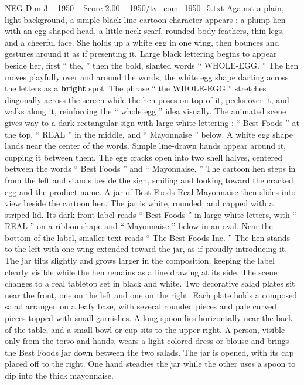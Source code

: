 \begin{textsample}{NEG Dim 3 – 1950 – Score 2.00 – 1950/tv\_com\_1950\_5.txt}  \label{ex:f3_neg_087}
Against a plain, light background, a simple black-line cartoon character appears : a plump hen with an egg-shaped head, a little neck scarf, rounded body feathers, thin legs, and a cheerful face.
She holds up a white egg in one wing, then bounces and gestures around it as if presenting it.
Large black lettering begins to appear beside her, first “ the, ” then the bold, slanted words “ WHOLE-EGG. ” The hen moves playfully over and around the words, the white egg shape darting across the letters as a \textbf{bright} spot.
The phrase “ the WHOLE-EGG ” stretches diagonally across the screen while the hen poses on top of it, peeks over it, and walks along it, reinforcing the “ whole egg ” idea visually.
The animated scene gives way to a dark rectangular sign with large white lettering : “ Best Foods ” at the top, “ REAL ” in the middle, and “ Mayonnaise ” below.
A white egg shape lands near the center of the words.
Simple line-drawn hands appear around it, cupping it between them.
The egg cracks open into two shell halves, centered between the words “ Best Foods ” and “ Mayonnaise. ” The cartoon hen steps in from the left and stands beside the sign, smiling and looking toward the cracked egg and the product name.
A jar of Best Foods Real Mayonnaise then slides into view beside the cartoon hen.
The jar is white, rounded, and capped with a striped lid.
Its dark front label reads “ Best Foods ” in large white letters, with “ REAL ” on a ribbon shape and “ Mayonnaise ” below in an oval.
Near the bottom of the label, smaller text reads “ The Best Foods Inc. ” The hen stands to the left with one wing extended toward the jar, as if proudly introducing it.
The jar tilts slightly and grows larger in the composition, keeping the label clearly visible while the hen remains as a line drawing at its side.
The scene changes to a real tabletop set in black and white.
Two decorative salad plates sit near the front, one on the left and one on the right.
Each plate holds a composed salad arranged on a leafy base, with several rounded pieces and pale curved pieces topped with small garnishes.
A long spoon lies horizontally near the back of the table, and a small bowl or cup sits to the upper right.
A person, visible only from the torso and hands, wears a light-colored dress or blouse and brings the Best Foods jar down between the two salads.
The jar is opened, with its cap placed off to the right.
One hand steadies the jar while the other uses a spoon to dip into the thick mayonnaise.

\end{textsample}
